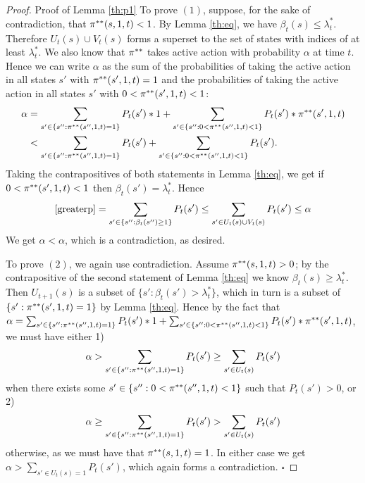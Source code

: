 \section{}\label{ap:p1}
\begin{proof}{Proof of Lemma \ref{th:p1}}
To prove $(1)$, suppose, for the sake of contradiction, that $\pi^{**}(s,1,t) < 1$. By Lemma \ref{th:eq}, we have $\beta_t(s) \leq \lambda^*_t$. Therefore $U_t(s)\cup V_t(s)$ forms a superset to the set of states with indices of at least $\lambda_t^*$. We also know that $\pi^{**}$ takes active action with probability $\alpha$ at time $t$. Hence we can write $\alpha$ as the sum of the probabilities of taking the active action in all states $s'$ with $\pi^{**}(s',1,t)=1$ and the probabilities of taking the active action in all states $s'$ with $0<\pi^{**}(s',1,t)<1$:
\begin{align}
\alpha &= \sum_{s'\in\{s'':\pi^{**}(s'',1,t)=1\}}P_t(s') * 1 + \sum_{s'\in\{s'':0<\pi^{**}(s'',1,t)<1\}}P_t(s') * \pi^{**}(s',1,t) \nonumber\\
& < \sum_{s'\in\{s'':\pi^{**}(s'',1,t)=1\}}P_t(s') + \sum_{s'\in\{s'':0<\pi^{**}(s'',1,t)<1\}}P_t(s').\label{greaterp}
\end{align}
Taking the contrapositives of both statements in Lemma \ref{th:eq}, we get if $0<\pi^{**}(s',1,t)<1$ then $\beta_t(s')=\lambda^*_t$. Hence
\begin{align*}
\eqref{greaterp} = \sum_{s'\in\{s'':\beta_t(s'')\geq 1\}}P_t(s') \leq \sum_{s'\in U_t(s)\cup V_t(s)}P_t(s')\leq \alpha
\end{align*}
We get $\alpha < \alpha$, which is a contradiction, as desired. 

To prove $(2)$, we again use contradiction. Assume $\pi^{**}(s,1,t)>0$; by the contrapositive of the second statement of Lemma \ref{th:eq} we know $\beta_t(s)\geq \lambda^*_t$. Then $U_{t+1}(s)$ is a subset of $\{s':\beta_t(s')>\lambda^*_t\}$, which in turn is a subset of $\{s':\pi^{**}(s',1,t)=1\}$ by Lemma \ref{th:eq}. 
Hence by the fact that $\alpha= \sum_{s'\in\{s'':\pi^{**}(s'',1,t)=1\}}P_t(s') * 1 + \sum_{s'\in\{s'':0<\pi^{**}(s'',1,t)<1\}}P_t(s') * \pi^{**}(s',1,t)$, we must have either 1)
\[\alpha> \sum_{s'\in\{s'':\pi^{**}(s'',1,t)=1\}}P_t(s')\geq \sum_{s'\in U_{t}(s)}P_t(s')\]
when there exists some $s'\in\{s'':0<\pi^{**}(s'',1,t)<1\}$ such that $P_{t}(s')>0$, or 2)
\[\alpha\geq \sum_{s'\in\{s'':\pi^{**}(s'',1,t)=1\}}P_t(s')> \sum_{s'\in U_{t}(s)}P_t(s')\]
otherwise, as we must have that $\pi^{**}(s,1,t)=1$. 
In either case we get $\alpha>\sum_{s'\in U_{t}(s)=1}P_t(s')$, which again forms a contradiction.
$\square$
\end{proof}
